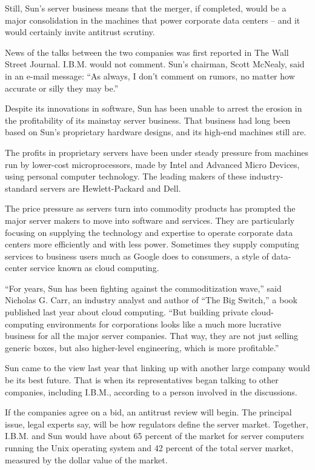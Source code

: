 \documentclass[12pt,a4paper,onecolumn]{article}
\begin{document}
\begin{CJK*}{GBK}{song}
Still, Sun's server business means that the merger, if completed, would be a major consolidation in
the machines that power corporate data centers -- and it would certainly invite antitrust scrutiny.

News of the talks between the two companies was first reported in The Wall Street Journal. I.B.M.
would not comment. Sun's chairman, Scott McNealy, said in an e-mail message: ``As always, I don't
comment on rumors, no matter how accurate or silly they may be.''

Despite its innovations in software, Sun has been unable to arrest the erosion in the profitability
of its mainstay server business. That business had long been based on Sun's proprietary hardware
designs, and its high-end machines still are.

The profits in proprietary servers have been under steady pressure from machines run by lower-cost
microprocessors, made by Intel and Advanced Micro Devices, using personal computer technology. The
leading makers of these industry-standard servers are Hewlett-Packard and Dell.

The price pressure as servers turn into commodity products has prompted the major server makers to
move into software and services. They are particularly focusing on supplying the technology and
expertise to operate corporate data centers more efficiently and with less power. Sometimes they
supply computing services to business users much as Google does to consumers, a style of data-center
service known as cloud computing.

``For years, Sun has been fighting against the commoditization wave,'' said Nicholas G. Carr, an
industry analyst and author of ``The Big Switch,'' a book published last year about cloud computing.
``But building private cloud-computing environments for corporations looks like a much more
lucrative business for all the major server companies. That way, they are not just selling generic
boxes, but also higher-level engineering, which is more profitable.''

Sun came to the view last year that linking up with another large company would be its best future.
That is when its representatives began talking to other companies, including I.B.M., according to a
person involved in the discussions.

If the companies agree on a bid, an antitrust review will begin. The principal issue, legal experts
say, will be how regulators define the server market. Together, I.B.M. and Sun would have about 65
percent of the market for server computers running the Unix operating system and 42 percent of the
total server market, measured by the dollar value of the market.


\end{CJK*}
\end{document}
